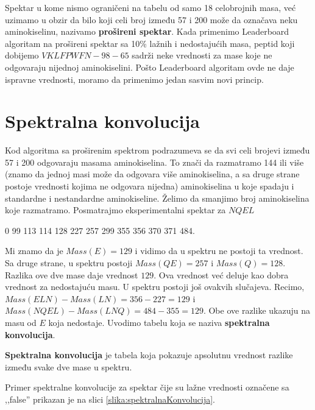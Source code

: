 Spektar u kome nismo ograničeni na tabelu od samo 18 celobrojnih masa, već uzimamo u obzir da bilo koji celi broj između 57 i 200 može da označava neku aminokiselinu, nazivamo \textbf{prošireni spektar}. Kada primenimo Leaderboard algoritam na prošireni spektar sa 10\% lažnih i nedostajućih masa, peptid koji dobijemo $  VKLFPWFN-98-65 $ sadrži neke vrednosti za mase koje ne odgovaraju nijednoj aminokiselini. Pošto Leaderboard algoritam ovde ne daje ispravne vrednosti, moramo da primenimo jedan sasvim novi princip.

\section{Spektralna konvolucija} \label{konvolucija}

Kod algoritma sa proširenim spektrom podrazumeva se da svi celi brojevi između 57 i 200 odgovaraju masama aminokiselina. To znači da razmatramo 144 ili više (znamo da jednoj masi može da odgovara više aminokiselina, a sa druge strane postoje vrednosti kojima ne odgovara nijedna) aminokiselina u koje spadaju i standardne i nestandardne aminokiseline. Želimo da smanjimo broj aminokiselina koje razmatramo. Posmatrajmo eksperimentalni spektar za $ NQEL $
\begin{center}
0 99 113 114 128 227 257 299 355 356 370 371 484.
\end{center}
\noindent Mi znamo da je $ Mass(E) = 129 $ i vidimo da u spektru ne postoji ta vrednost. Sa druge strane, u spektru postoji $ Mass(QE) = 257 $ i $ Mass(Q) = 128 $. Razlika ove dve mase daje vrednost $129$. Ova vrednost već deluje kao dobra vrednost za nedostajuću masu. U spektru postoji još ovakvih slučajeva. Recimo, $ Mass(ELN) - Mass(LN) = 356 - 227 = 129 $ i $ Mass(NQEL) - Mass(LNQ) = 484 - 355 = 129 $. Obe ove razlike ukazuju na masu od $E$ koja nedostaje. Uvodimo tabelu koja se naziva \textbf{spektralna konvolucija}.
\begin{definicija}
\textbf{Spektralna konvolucija} je tabela koja pokazuje apsolutnu vrednost razlike između svake dve mase u spektru.
\end{definicija}

Primer spektralne konvolucije za spektar čije su lažne vrednosti označene sa ,,false'' prikazan je na slici \ref{slika:spektralnaKonvolucija}.

